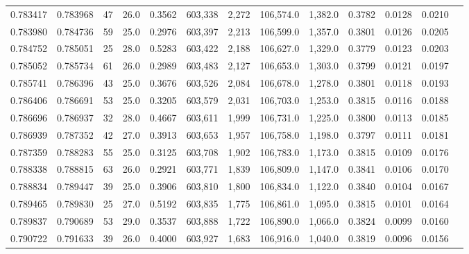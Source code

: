\begin{tabular}{rrrrrrrrrrrrr}
0.783417 & 0.783968 &    47 & 26.0 &                                     0.3562 & 603,338 &   2,272 & 106,574.0 &   1,382.0 & 0.3782 & 0.0128 & 0.0210 \\
0.783980 & 0.784736 &    59 & 25.0 &                                     0.2976 & 603,397 &   2,213 & 106,599.0 &   1,357.0 & 0.3801 & 0.0126 & 0.0205 \\
0.784752 & 0.785051 &    25 & 28.0 &                                     0.5283 & 603,422 &   2,188 & 106,627.0 &   1,329.0 & 0.3779 & 0.0123 & 0.0203 \\
0.785052 & 0.785734 &    61 & 26.0 &                                     0.2989 & 603,483 &   2,127 & 106,653.0 &   1,303.0 & 0.3799 & 0.0121 & 0.0197 \\
0.785741 & 0.786396 &    43 & 25.0 &                                     0.3676 & 603,526 &   2,084 & 106,678.0 &   1,278.0 & 0.3801 & 0.0118 & 0.0193 \\
0.786406 & 0.786691 &    53 & 25.0 &                                     0.3205 & 603,579 &   2,031 & 106,703.0 &   1,253.0 & 0.3815 & 0.0116 & 0.0188 \\
0.786696 & 0.786937 &    32 & 28.0 &                                     0.4667 & 603,611 &   1,999 & 106,731.0 &   1,225.0 & 0.3800 & 0.0113 & 0.0185 \\
0.786939 & 0.787352 &    42 & 27.0 &                                     0.3913 & 603,653 &   1,957 & 106,758.0 &   1,198.0 & 0.3797 & 0.0111 & 0.0181 \\
0.787359 & 0.788283 &    55 & 25.0 &                                     0.3125 & 603,708 &   1,902 & 106,783.0 &   1,173.0 & 0.3815 & 0.0109 & 0.0176 \\
0.788338 & 0.788815 &    63 & 26.0 &                                     0.2921 & 603,771 &   1,839 & 106,809.0 &   1,147.0 & 0.3841 & 0.0106 & 0.0170 \\
0.788834 & 0.789447 &    39 & 25.0 &                                     0.3906 & 603,810 &   1,800 & 106,834.0 &   1,122.0 & 0.3840 & 0.0104 & 0.0167 \\
0.789465 & 0.789830 &    25 & 27.0 &                                     0.5192 & 603,835 &   1,775 & 106,861.0 &   1,095.0 & 0.3815 & 0.0101 & 0.0164 \\
0.789837 & 0.790689 &    53 & 29.0 &                                     0.3537 & 603,888 &   1,722 & 106,890.0 &   1,066.0 & 0.3824 & 0.0099 & 0.0160 \\
0.790722 & 0.791633 &    39 & 26.0 &                                     0.4000 & 603,927 &   1,683 & 106,916.0 &   1,040.0 & 0.3819 & 0.0096 & 0.0156 \\

\end{tabular}
